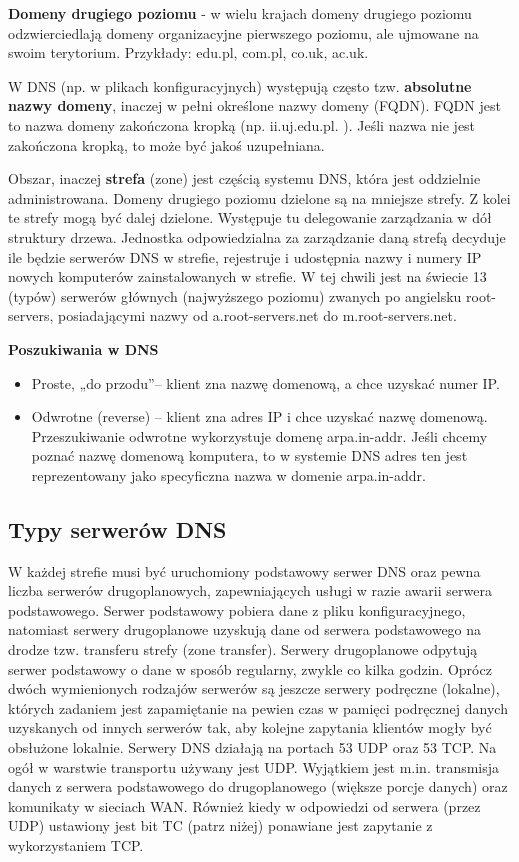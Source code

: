 \documentclass[../main.tex]{subfiles}
\begin{document}
    \textbf{Domeny drugiego poziomu} - w wielu krajach domeny drugiego poziomu odzwierciedlają
    domeny organizacyjne pierwszego poziomu, ale ujmowane na swoim terytorium. Przykłady:
    edu.pl, com.pl, co.uk, ac.uk.

    W DNS (np. w plikach konfiguracyjnych) występują często tzw. \textbf{absolutne nazwy domeny},
    inaczej w pełni określone nazwy domeny (FQDN). FQDN jest to nazwa domeny zakończona kropką (np. ii.uj.edu.pl. ). Jeśli nazwa nie
    jest zakończona kropką, to może być jakoś uzupełniana.

    Obszar, inaczej \textbf{strefa} (zone) jest częścią systemu DNS, która jest oddzielnie administrowana.
    Domeny drugiego poziomu dzielone są na mniejsze strefy. Z kolei te strefy mogą być dalej
    dzielone. Występuje tu delegowanie zarządzania w dół struktury drzewa. Jednostka
    odpowiedzialna za zarządzanie daną strefą decyduje ile będzie serwerów DNS w strefie,
    rejestruje i udostępnia nazwy i numery IP nowych komputerów zainstalowanych w strefie.
    W tej chwili jest na świecie 13 (typów) serwerów głównych (najwyższego poziomu) zwanych
    po angielsku root-servers, posiadającymi nazwy od a.root-servers.net do m.root-servers.net.

    \textbf{Poszukiwania w DNS}
    \begin{itemize}
        \item Proste, „do przodu”– klient zna nazwę domenową, a chce uzyskać numer IP.
        \item Odwrotne (reverse) – klient zna adres IP i chce uzyskać nazwę domenową.
        Przeszukiwanie odwrotne wykorzystuje domenę arpa.in-addr. Jeśli chcemy
        poznać nazwę domenową komputera, to w systemie DNS adres ten
        jest reprezentowany jako specyficzna nazwa w domenie arpa.in-addr.
    \end{itemize}

    \subsection{Typy serwerów DNS}
    W każdej strefie musi być uruchomiony podstawowy serwer DNS oraz pewna liczba
    serwerów drugoplanowych, zapewniających usługi w razie awarii serwera podstawowego.
    Serwer podstawowy pobiera dane z pliku konfiguracyjnego, natomiast serwery
    drugoplanowe uzyskują dane od serwera podstawowego na drodze tzw. transferu strefy
    (zone transfer). Serwery drugoplanowe odpytują serwer podstawowy o dane w sposób
    regularny, zwykle co kilka godzin. Oprócz dwóch wymienionych rodzajów serwerów są
    jeszcze serwery podręczne (lokalne), których zadaniem jest zapamiętanie na pewien czas w
    pamięci podręcznej danych uzyskanych od innych serwerów tak, aby kolejne zapytania
    klientów mogły być obsłużone lokalnie.
    Serwery DNS działają na portach 53 UDP oraz 53 TCP. Na ogół w warstwie transportu
    używany jest UDP. Wyjątkiem jest m.in. transmisja danych z serwera podstawowego do
    drugoplanowego (większe porcje danych) oraz komunikaty w sieciach WAN. Również kiedy w
    odpowiedzi od serwera (przez UDP) ustawiony jest bit TC (patrz niżej) ponawiane jest
    zapytanie z wykorzystaniem TCP.
\end{document}

